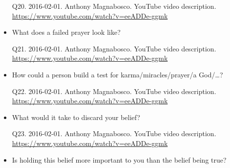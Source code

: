 \documentclass[a4paper]{scrartcl}
\begin{document}
\begin{itemize}
                \begin{tiny}
                    Q20.
                    2016-02-01.
                    Anthony Magnabosco.
                        YouTube video description.
                        \\
                        \url{ https://www.youtube.com/watch?v=eeADDe-ggmk }
                    \par
                \end{tiny}
                    \item What does a failed prayer look like?
                    
                \begin{tiny}
                    Q21.
                    2016-02-01.
                    Anthony Magnabosco.
                        YouTube video description.
                        \\
                        \url{ https://www.youtube.com/watch?v=eeADDe-ggmk }
                    \par
                \end{tiny}
                    \item How could a person build a test for karma\slash miracles\slash prayer\slash a God\slash \dots?
                    
                \begin{tiny}
                    Q22.
                    2016-02-01.
                    Anthony Magnabosco.
                        YouTube video description.
                        \\
                        \url{ https://www.youtube.com/watch?v=eeADDe-ggmk }
                    \par
                \end{tiny}
                    \item What would it take to discard your belief?
                    
                \begin{tiny}
                    Q23.
                    2016-02-01.
                    Anthony Magnabosco.
                        YouTube video description.
                        \\
                        \url{ https://www.youtube.com/watch?v=eeADDe-ggmk }
                    \par
                \end{tiny}
                    \item Is holding this belief more important to you than the belief being true?
                    

\end{itemize}
\end{document}
